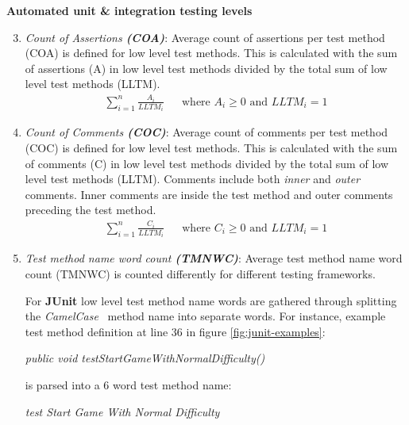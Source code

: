     \begin{addmargin}[0em]{0em}
    \vspace{10px}
    \textbf{Automated unit \& integration testing levels}
    \vspace{5px}
    \newline
    \begin{enumerate}
    \setcounter{enumi}{2}
    \item \textit{Count of Assertions \textbf{(COA)}}:
    Average count of assertions per test method (COA) is defined for low level test methods. This is calculated with
    the sum of assertions (A) in low level test methods divided by the total sum of low level test methods (LLTM).
    \begin{align*}
        \sum_{i=1}^{n}\frac{A_{i}}{LLTM_{i}} && \text {where } A_{i} \geq 0 \text{ and } LLTM_{i} = 1
    \end{align*}

    \item \textit{Count of Comments \textbf{(COC)}}:
    Average count of comments per test method (COC) is defined for low level test methods. This is calculated with the
    sum of comments (C) in low level test methods divided by the total sum of low level test methods (LLTM). Comments include both
    \textit{inner} and \textit{outer} comments. Inner comments are inside the test method and outer comments preceding the test method.
    \begin{align*}
        \sum_{i=1}^{n}\frac{C_{i}}{LLTM_{i}} && \text {where } C_{i} \geq 0 \text{ and } LLTM_{i} = 1
    \end{align*}

    \item \textit{Test method name word count \textbf{(TMNWC)}}:
    Average test method name word count (TMNWC) is counted differently for different testing frameworks.

    For \textbf{JUnit} low level test method name words are gathered through splitting the \textit{CamelCase}~\cite{wiki:camelcase}
    method name into separate words. For instance, example test method definition at line 36 in figure \ref{fig:junit-examples}:


    \begin{addmargin}[0em]{0em}
    \vspace{10px}
    \textit{public void testStartGameWithNormalDifficulty()}
    \newline
    \end{addmargin}
    is parsed into a 6 word test method name:
    \begin{addmargin}[0em]{0em}
    \vspace{10px}
    \textit{test Start Game With Normal Difficulty}
    \newline
    \end{addmargin}


\end{enumerate}
\end{addmargin}

